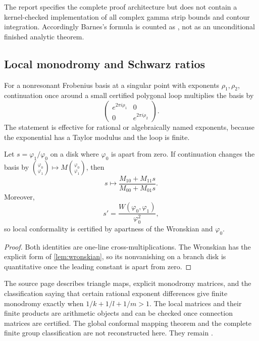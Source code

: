 \begin{audit}
The report specifies the complete proof architecture but does not contain a
kernel-checked implementation of all complex gamma strip bounds and contour
integration.  Accordingly Barnes's formula is counted as \StatusC{}, not as
an unconditional finished analytic theorem.
\end{audit}

\subsection{Local monodromy and Schwarz ratios}

For a nonresonant Frobenius basis at a singular point with exponents
\(\rho_1,\rho_2\), continuation once around a small certified polygonal loop
multiplies the basis by
\[
 \begin{pmatrix}e^{2\pi i\rho_1}&0\\0&e^{2\pi i\rho_2}\end{pmatrix}.
\]
The statement is effective for rational or algebraically named exponents,
because the exponential has a Taylor modulus and the loop is finite.

\begin{proposition}\label{prop:schwarz-local}
Let \(s=\varphi_1/\varphi_0\) on a disk where \(\varphi_0\) is apart from
zero.  If continuation changes the basis by
\(\binom{\varphi_0}{\varphi_1}\mapsto
 M\binom{\varphi_0}{\varphi_1}\), then
\[
 s\longmapsto\frac{M_{10}+M_{11}s}{M_{00}+M_{01}s}.
\]
Moreover,
\[
 s'=\frac{W(\varphi_0,\varphi_1)}{\varphi_0^2},
\]
so local conformality is certified by apartness of the Wronskian and
\(\varphi_0\).
\end{proposition}

\begin{proof}
Both identities are one-line cross-multiplications.  The Wronskian has the
explicit form of \cref{lem:wronskian}, so its nonvanishing on a branch disk is
quantitative once the leading constant is apart from zero.
\end{proof}

\begin{audit}
The source page describes triangle maps, explicit monodromy matrices, and the
classification saying that certain rational exponent differences give finite
monodromy exactly when \(1/k+1/l+1/m>1\).  The local matrices and their finite
products are arithmetic objects and can be checked once connection matrices
are certified.  The global conformal mapping theorem and the complete finite
group classification are not reconstructed here.  They remain \StatusD{}.
\end{audit}

